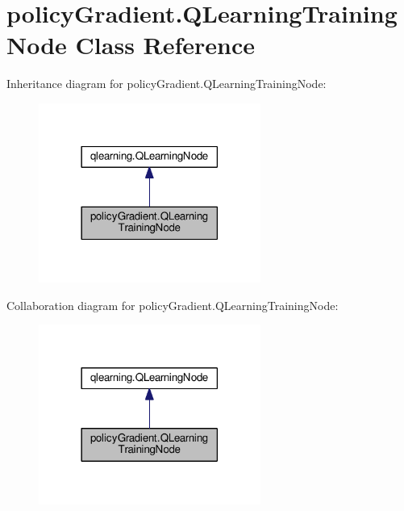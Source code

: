 \hypertarget{classpolicy_gradient_1_1_q_learning_training_node}{}\section{policy\+Gradient.\+Q\+Learning\+Training\+Node Class Reference}
\label{classpolicy_gradient_1_1_q_learning_training_node}


Inheritance diagram for policy\+Gradient.\+Q\+Learning\+Training\+Node\+:
\nopagebreak
\begin{figure}[H]
\begin{center}
\leavevmode
\includegraphics[width=206pt]{classpolicy_gradient_1_1_q_learning_training_node__inherit__graph}
\end{center}
\end{figure}


Collaboration diagram for policy\+Gradient.\+Q\+Learning\+Training\+Node\+:
\nopagebreak
\begin{figure}[H]
\begin{center}
\leavevmode
\includegraphics[width=206pt]{classpolicy_gradient_1_1_q_learning_training_node__coll__graph}
\end{center}
\end{figure}
